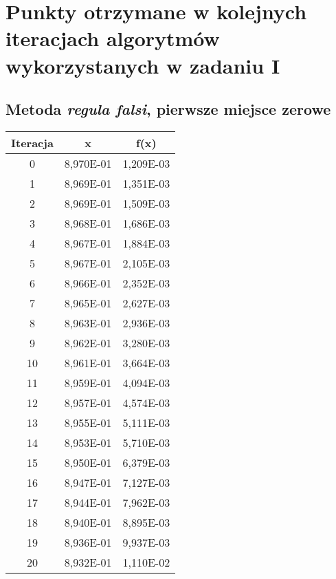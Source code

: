 \documentclass[12pt]{article}
\begin{document}
\clearpage
\section{Punkty otrzymane w kolejnych iteracjach algorytmów wykorzystanych w zadaniu I}
\label{sec:samples}

\subsection{Metoda \textit{regula falsi}, pierwsze miejsce zerowe}
\begin{center}
\begin{longtable}{|c|c|c|} 
    \hline
    \textbf{Iteracja} & \textbf{x} & \textbf{f(x)} \\
    \hline\hline
    0	&     8,970E-01	&   1,209E-03 \\ \hline
    1	&     8,969E-01	&   1,351E-03 \\ \hline
    2	&     8,969E-01	&   1,509E-03 \\ \hline
    3	&     8,968E-01	&   1,686E-03 \\ \hline
    4	&     8,967E-01	&   1,884E-03 \\ \hline
    5	&     8,967E-01	&   2,105E-03 \\ \hline
    6	&     8,966E-01	&   2,352E-03 \\ \hline
    7	&     8,965E-01	&   2,627E-03 \\ \hline
    8	&     8,963E-01	&   2,936E-03 \\ \hline
    9	&     8,962E-01	&   3,280E-03 \\ \hline
    10	&     8,961E-01	&   3,664E-03 \\ \hline
    11	&     8,959E-01	&   4,094E-03 \\ \hline
    12	&     8,957E-01	&   4,574E-03 \\ \hline
    13	&     8,955E-01	&   5,111E-03 \\ \hline
    14	&     8,953E-01	&   5,710E-03 \\ \hline
    15	&     8,950E-01	&   6,379E-03 \\ \hline
    16	&     8,947E-01	&   7,127E-03 \\ \hline
    17	&     8,944E-01	&   7,962E-03 \\ \hline
    18	&     8,940E-01	&   8,895E-03 \\ \hline
    19	&     8,936E-01	&   9,937E-03 \\ \hline
    20	&     8,932E-01	&   1,110E-02 \\ \hline

\end{longtable}
\end{center}
\end{document}
